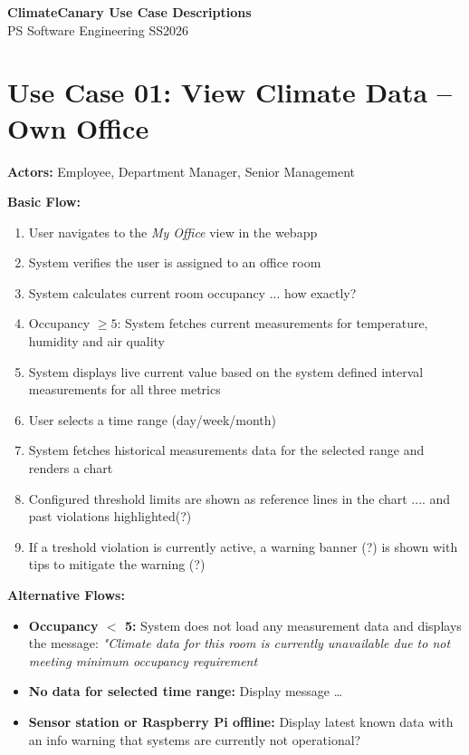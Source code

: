 \documentclass{article}
\begin{document}
\begin{center}
    {\LARGE \textbf{ClimateCanary Use Case Descriptions}}\\[0.5em]
    {\large PS Software Engineering SS2026}
\end{center}

\vspace{1em}

\section*{Use Case 01: View Climate Data -- Own Office}

\textbf{Actors:} Employee, Department Manager, Senior Management 

\textbf{Basic Flow:}
\begin{enumerate}
    \item User navigates to the \textit{My Office} view in the webapp
    \item System verifies the user is assigned to an office room
    \item System calculates current room occupancy ... how exactly?
    \item Occupancy $\geq 5$: System fetches current measurements for temperature, humidity and air quality
    \item System displays live current value based on the system defined interval measurements for all three metrics
    \item User selects a time range (day/week/month)
    \item System fetches historical measurements data for the selected range and renders a chart
    \item Configured threshold limits are shown as reference lines in the chart .... and past violations highlighted(?)
    \item If a treshold violation is currently active, a warning banner (?) is shown with tips to mitigate the warning (?)
\end{enumerate}

\textbf{Alternative Flows:}
\begin{itemize}
    \item \textbf{Occupancy $<$ 5:} System does not load any measurement data and displays the message: \textit{"Climate data for this room is currently unavailable due to not meeting minimum occupancy requirement}
    \item \textbf{No data for selected time range:} Display message \dots
    \item \textbf{Sensor station or Raspberry Pi offline:} Display latest known data with an info warning that systems are currently not operational?
\end{itemize}
\end{document}
